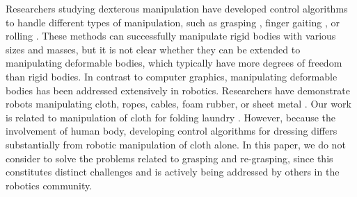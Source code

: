 


Researchers studying dexterous manipulation have developed control algorithms to handle different types of manipulation, such as grasping \cite{Pollard:2005:PBG,Kry:2006:ICS,Wang:2013:VHM,Zhao:2013:RRP}, finger gaiting \cite{Ye:2012:SDH}, or rolling \cite{Bai:2014:DMU}. These methods can successfully manipulate rigid bodies with various sizes and masses, but it is not clear whether they can be extended to manipulating deformable bodies, which typically have more degrees of freedom than rigid bodies. In contrast to computer graphics, manipulating deformable bodies has been addressed extensively in robotics. Researchers have demonstrate robots manipulating cloth, ropes, cables, foam rubber, or sheet metal \cite{Kosuge:1995:MFO,Wu:1995:AHC,Fahantidis:1997:RHF,Osawa:2007:UML,Cusumano:2011:BCD,Bersch:2011:BRC,Miller:2012:GAR}. Our work is related to manipulation of cloth for folding laundry \cite{Osawa:2007:UML,Cusumano:2011:BCD,Bersch:2011:BRC,Miller:2012:GAR}. However, because the involvement of human body, developing control algorithms for dressing differs substantially from robotic manipulation of cloth alone. In this paper, we do not consider to solve the problems related to grasping and re-grasping, since this constitutes distinct challenges and is actively being addressed by others in the robotics community.



